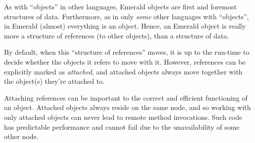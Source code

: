 As with ``objects'' in other languages, Emerald objects are first and
foremost structures of data.  Furthermore, as in only \emph{some}
other languages with ``objects'', in Emerald (almost) everything is an
object. Hence, an Emerald object is really more a structure of
references (to other objects), than a structure of data.

By default, when this ``structure of references'' moves, it is up to
the run-time to decide whether the objects it refers to move with it.
However, references can be explicitly marked as \emph{attached}, and
attached objects always move together with the object(s) they're
attached to.

Attaching references can be important to the correct and efficient
functioning of an object. Attached objects always reside on the same
node, and so working with only attached objects can never lead to
remote method invocations. Such code has predictable performance and
cannot fail due to the unavailability of some other node.




